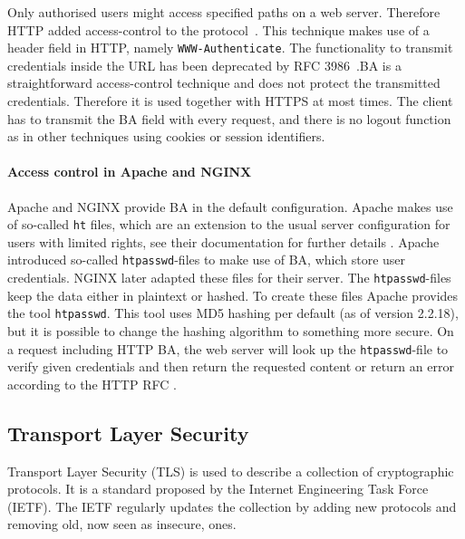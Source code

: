 Only authorised users might access specified paths on a web server. Therefore
HTTP added access-control to the protocol~. This
technique makes use of a header field in HTTP, namely \texttt{WWW-Authenticate}.
The functionality to transmit credentials inside the URL has been deprecated by
RFC 3986~.BA is a straightforward access-control
technique and does not protect the transmitted credentials. Therefore it is used
together with HTTPS at most times. The client has to transmit the BA field with
every request, and there is no logout function as in other techniques using
cookies or session identifiers.

\paragraph{Access control in Apache and NGINX}

Apache and NGINX provide BA in the default configuration. Apache makes use of
so-called \texttt{ht} files, which are an extension to the usual server
configuration for users with limited rights, see their documentation for further
details . Apache introduced so-called
\texttt{htpasswd}-files to make use of BA, which store user credentials. NGINX
later adapted these files for their server. The \texttt{htpasswd}-files keep the
data either in plaintext or hashed. To create these files Apache provides the
tool \texttt{htpasswd}. This tool uses MD5
hashing per default (as of version 2.2.18), but it is possible to change the
hashing algorithm to something more secure. On a request including HTTP BA, the
web server will look up the \texttt{htpasswd}-file to verify given credentials
and then return the requested content or return an error according to the HTTP
RFC .

\subsection{Transport Layer Security}

Transport Layer Security (TLS) is used to describe a collection of cryptographic
protocols. It is a standard proposed by the Internet Engineering Task Force
(IETF). The IETF regularly updates the collection by adding new protocols and
removing old, now seen as insecure, ones.

